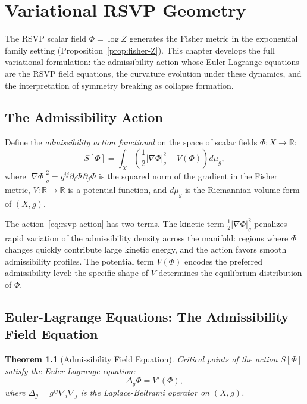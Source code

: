 \documentclass[12pt, oneside]{book}
\theoremstyle{plain-flyxion}
\newtheorem{theorem}{Theorem}[chapter]
\theoremstyle{definition-flyxion}
\begin{document}
\chapter{Variational RSVP Geometry}

The RSVP scalar field $\Phi = \log Z$ generates the Fisher metric in the exponential
family setting (Proposition~\ref{prop:fisher-Z}). This chapter develops the full
variational formulation: the admissibility action whose Euler-Lagrange equations are the
RSVP field equations, the curvature evolution under these dynamics, and the interpretation
of symmetry breaking as collapse formation.

\section{The Admissibility Action}

Define the \emph{admissibility action functional} on the space of scalar fields
$\Phi: X \to \mathbb{R}$:
\begin{equation}\label{eq:rsvp-action}
S[\Phi] = \int_X \left(\frac{1}{2}|\nabla\Phi|_g^2 - V(\Phi)\right) d\mu_g,
\end{equation}
where $|\nabla\Phi|_g^2 = g^{ij}\partial_i\Phi\,\partial_j\Phi$ is the squared norm of
the gradient in the Fisher metric, $V: \mathbb{R} \to \mathbb{R}$ is a potential
function, and $d\mu_g$ is the Riemannian volume form of $(X,g)$.

The action~\eqref{eq:rsvp-action} has two terms. The kinetic term $\frac{1}{2}|\nabla
\Phi|_g^2$ penalizes rapid variation of the admissibility density across the manifold:
regions where $\Phi$ changes quickly contribute large kinetic energy, and the action
favors smooth admissibility profiles. The potential term $V(\Phi)$ encodes the preferred
admissibility level: the specific shape of $V$ determines the equilibrium distribution
of $\Phi$.

\section{Euler-Lagrange Equations: The Admissibility Field Equation}

\begin{theorem}[Admissibility Field Equation]\label{thm:euler-lagrange}
Critical points of the action $S[\Phi]$ satisfy the Euler-Lagrange equation:
\begin{equation}\label{eq:el}
\Delta_g \Phi = V'(\Phi),
\end{equation}
where $\Delta_g = g^{ij}\nabla_i\nabla_j$ is the Laplace-Beltrami operator on $(X,g)$.
\end{theorem}
\end{document}
